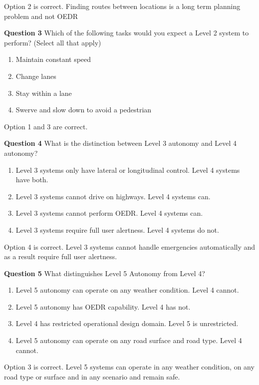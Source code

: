 Option 2 is correct. Finding routes between locations is a long term planning problem and not OEDR


\textbf{Question 3}
Which of the following tasks would you expect a Level 2 system to perform? (Select all that apply)


\begin{enumerate}
\item Maintain constant speed
\item Change lanes
\item Stay within a lane
\item Swerve and slow down to avoid a pedestrian
\end{enumerate}

Option 1 and 3 are correct.

\textbf{Question 4}
What is the distinction between Level 3 autonomy and Level 4 autonomy? 


\begin{enumerate}
\item Level 3 systems only have lateral or longitudinal control. Level 4 systems have both.
\item Level 3 systems cannot drive on highways. Level 4 systems can.
\item Level 3 systems cannot perform OEDR. Level 4 systems can.
\item Level 3 systems require full user alertness. Level 4 systems do not.
\end{enumerate}

Option 4 is correct.  Level 3 systems cannot handle emergencies automatically and as a result require full user alertness.


\textbf{Question 5}
What distinguishes Level 5 Autonomy from Level 4?


\begin{enumerate}
\item Level 5 autonomy can operate on any weather condition. Level 4 cannot.
\item Level 5 autonomy has OEDR capability. Level 4 has not.
\item Level 4 has restricted operational design domain. Level 5 is unrestricted.
\item Level 5 autonomy can operate on any road surface and road type. Level 4 cannot.
\end{enumerate}

Option 3 is correct. Level 5 systems can operate in any weather condition, on any road type or surface and in any scenario and remain safe.


